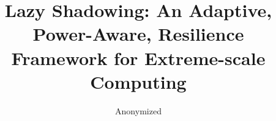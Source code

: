 \documentclass{sig-alternate}
\begin{document}
%

\title{Lazy Shadowing: An Adaptive, Power-Aware, Resilience Framework for Extreme-scale Computing}
%
%
%
%
%

%

\author{
\alignauthor
Anonymized
}

\end{document}
